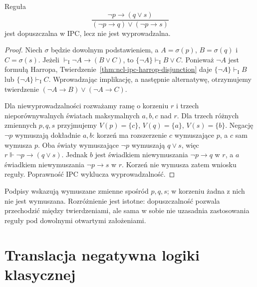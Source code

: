 \begin{przyklad}
\label{ex:ncl-ipc-harrop-rule}
Reguła
\[
 \frac{\neg p\to(q\vee s)}
 {(\neg p\to q)\vee(\neg p\to s)}
\]
jest dopuszczalna w IPC, lecz nie jest wyprowadzalna.
\end{przyklad}
\begin{proof}
Niech $\sigma$ będzie dowolnym podstawieniem,
a $A=\sigma(p)$, $B=\sigma(q)$ i $C=\sigma(s)$.
Jeżeli $\vdash_{\mathrm I}\neg A\to(B\vee C)$,
to $\{\neg A\}\vdash_{\mathrm I}B\vee C$.
Ponieważ $\neg A$ jest formułą Harropa,
Twierdzenie~\ref{thm:ncl-ipc-harrop-disjunction}
daje $\{\neg A\}\vdash_{\mathrm I}B$
lub $\{\neg A\}\vdash_{\mathrm I}C$. Wprowadzając
implikację, a następnie alternatywę, otrzymujemy
twierdzenie $(\neg A\to B)\vee(\neg A\to C)$.

Dla niewyprowadzalności rozważamy ramę o korzeniu $r$
i trzech nieporównywalnych światach maksymalnych
$a,b,c$ nad $r$. Dla trzech różnych zmiennych $p,q,s$ przyjmujemy
$V(p)=\{c\}$, $V(q)=\{a\}$, $V(s)=\{b\}$.
Negację $\neg p$ wymuszają dokładnie $a,b$:
korzeń ma rozszerzenie $c$ wymuszające $p$,
a $c$ sam wymusza $p$.
Oba światy wymuszające $\neg p$ wymuszają $q\vee s$,
więc $r\Vdash\neg p\to(q\vee s)$.
Jednak $b$ jest świadkiem niewymuszania
$\neg p\to q$ w $r$, a $a$ świadkiem niewymuszania
$\neg p\to s$ w $r$. Korzeń nie wymusza zatem
wniosku reguły. Poprawność IPC wyklucza
wyprowadzalność.
\end{proof}

\begin{center}
\end{center}
Podpisy wskazują wymuszane zmienne spośród $p,q,s$;
w korzeniu żadna z nich nie jest wymuszana.
Rozróżnienie jest istotne: dopuszczalność pozwala
przechodzić między twierdzeniami, ale sama w sobie
nie uzasadnia zastosowania reguły pod dowolnymi
otwartymi założeniami.

\section{Translacja negatywna logiki klasycznej}


